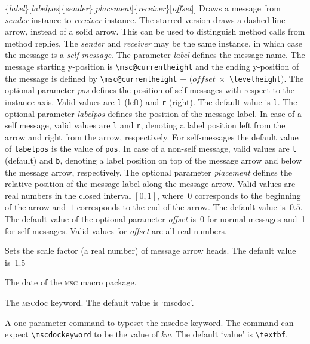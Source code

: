 \documentclass[a4paper]{article}
\newcommand{\cmd}[1]{\texttt{\bslash #1}}
\newcommand{\acro}[1]{{\scshape\lowercase{#1}}}
\newcommand\MSC{\acro{MSC}}
\newcommand{\MSCdoc}{\MSC{}doc}
\newcommand{\mscpack}{\MSC{} macro package}
\newcommand{\opt}[1]{[#1]}
\newenvironment{defs}{%
  \begin{list}{}%
              {\setlength{\labelwidth}{0pt}%
               \setlength{\labelsep}{1em}%
               \setlength{\leftmargin}{1em}%
               \setlength{\parsep}{1ex}%
               \setlength{\listparindent}{0pt}%
               \setlength{\rightmargin}{0pt}%
               \renewcommand{\makelabel}[1]{##1}%
               \raggedright%
              }%
  }{%
  \end{list}}
\begin{document}
\begin{defs}
\item[\cmd{mess(*)}\opt{\emph{pos}}\{\emph{label}\}\opt{\emph{labelpos}}\{\emph{sender}\}\opt{\emph{placement}}\{\emph{receiver}\}\opt{\emph{offset}}]
Draws a message from \emph{sender} instance to \emph{receiver}
instance. The starred version draws a dashed line arrow, instead of a
solid arrow. This can be used to distinguish method calls from method
replies.  The \emph{sender} and \emph{receiver} may be the same
instance, in which case the message is a \emph{self message}. The
parameter \emph{label} defines the message name. The message starting
y-position is \verb|\msc@currentheight| and the ending y-position of
the message is defined by \verb|\msc@currentheight| $+$
$(\textit{offset}\ \times $ \verb|\levelheight|$)$.  The optional
parameter \emph{pos} defines the position of self messages with
respect to the instance axis. Valid values are \verb+l+ (left) and
\verb+r+ (right). The default value is \verb+l+.  The optional
parameter \emph{labelpos} defines the position of the message
label. In case of a self message, valid values are \verb|l| and
\verb|r|, denoting a label position left from the arrow and right from
the arrow, respectively. For self-messages the default value of
\verb+labelpos+ is the value of \verb+pos+. In case of a non-self
message, valid values are \verb|t| (default) and \verb|b|, denoting a
label position on top of the message arrow and below the message
arrow, respectively.  The optional parameter \emph{placement} defines
the relative position of the message label along the message
arrow. Valid values are real numbers in the closed interval $[0,1]$,
where~$0$ corresponds to the beginning of the arrow and~$1$
corresponds to the end of the arrow. The default value is~$0.5$.  The
default value of the optional parameter \emph{offset} is~0 for normal
messages and~1 for self messages. Valid values for \emph{offset} are 
all real numbers.

\item[\cmd{messarrowscale}\{\emph{scalefactor}\}] Sets the scale
factor (a real number) of message arrow heads. The default value
is~1.5

\item[\cmd{mscdate}] The date of the \mscpack.


\item[\cmd{mscdockeyword}] The \MSCdoc{} keyword. The default value is `mscdoc'.

\item[\cmd{mscdockeywordstyle}\{\emph{kw}\}] A one-parameter command to
typeset the mscdoc keyword. The command can expect \verb|\mscdockeyword| to
be the value of \emph{kw}. The default `value' is \verb|\textbf|.




\end{defs}
\end{document}

